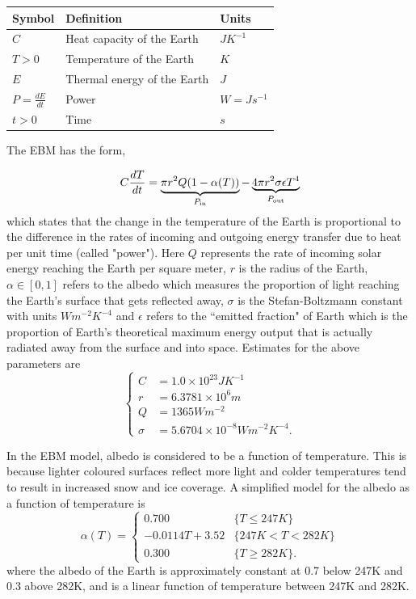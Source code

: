 \documentclass{exam}
\begin{document}
\begin{center}
\begin{tabular}{ l | l | l }
Symbol & Definition & Units \\
\hline \hline
$C$ & Heat capacity of the Earth & $J K^{-1}$\\  
$T > 0$ & Temperature of the Earth & $K$ \\
$E$ & Thermal energy of the Earth & $J$ \\
$P = \frac{d E}{d t}$ & Power & $W=J s^{-1}$ \\
$t>0$ & Time & $s$ \\
\end{tabular}
\end{center}
The EBM has the form,

$$
C \frac{d T}{d t} = \underbrace{\pi r^2 Q (1-\alpha(T))}_\text{$P_{\rm in}$} - \underbrace{4 \pi r^2 \sigma \epsilon T^4}_\text{$P_{\rm out}$}
$$
which states that the change in the temperature of the Earth is proportional to the difference in the rates of incoming and outgoing energy transfer due to heat per unit time (called "power").
Here $Q$ represents the rate of incoming solar energy reaching the Earth per square meter, $r$ is the radius of the Earth, $\alpha \in [0,1]$ refers to the albedo which measures the proportion of light reaching the Earth's surface that gets reflected away, $\sigma$ is the Stefan-Boltzmann constant with units $W m^{-2} K^{-4}$ and $\epsilon$ refers to the ``emitted fraction" of Earth which is the proportion of Earth's theoretical maximum energy output that is actually radiated away from the surface and into space. Estimates for the above parameters are
$$
\begin{cases}
    C & = 1.0 \times 10^{23} J K^{-1} \\
    r & = 6.3781 \times 10^{6}m \\
    Q & = 1365 W m^{-2} \\
    \sigma &= 5.6704 \times 10^{-8} W m^{-2} K^{-4}.
\end{cases}
$$

In the EBM model, albedo is considered to be a function of temperature. This is because lighter coloured surfaces reflect more light and colder temperatures tend to result in increased snow and ice coverage. A simplified model for the albedo as a function of temperature is $$
    \alpha(T) =
    \begin{cases}
    0.700 & \{T \leq 247K\} \\
    - 0.0114 T + 3.52 & \{247K < T < 282K\} \\
    0.300 & \{T \geq 282K\}.
    \end{cases}
    $$
where the albedo of the Earth is approximately constant at 0.7 below 247K and 0.3 above 282K, and is a linear function of temperature between 247K and 282K.
\end{document}
